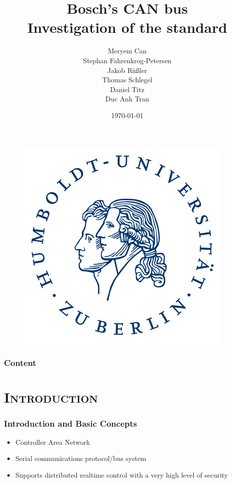 \documentclass[xcolor=x11names,compress]{beamer}
\renewcommand{\(}{\begin{columns}}
\renewcommand{\)}{\end{columns}}
\newcommand{\<}[1]{\begin{column}{#1}}
\renewcommand{\>}{\end{column}}
\begin{document}
\begin{frame}[plain]
  \begin{figure}
    \flushright
      \includegraphics[scale=0.12]{hu_logo}
    \vspace*{-0.4cm}
  \end{figure}

  \title{\textbf{Bosch's CAN bus\\Investigation of the standard}\\\vspace{0.2cm}}

  \author{Meryem Can\\Stephan Fahrenkrog-Petersen\\Jakob Rüßler\\Thomas Schlegel\\
  Daniel Titz\\Duc Anh Tran\\\vspace{0.3cm}}


\date{\today}
\titlepage
\end{frame}

\begin{frame}
\frametitle{Content}
\tableofcontents[]
\end{frame}

\section{\scshape Introduction}
\begin{frame}
  \frametitle{Introduction and Basic Concepts}
  \begin{itemize}
      \item Controller Area Network 
      \item Serial communications protocol/bus system
      \item Supports distributed realtime control with a very high level of security  ~\cite{can}
   
  \end{itemize}

\end{frame}
\end{document}
